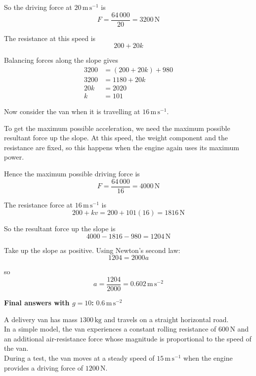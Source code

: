\documentclass[leqno]{article}
\begin{document}
\begin{enumerate}[
  label=\textbf{\arabic*.},
  leftmargin=*,
  topsep=0pt,
  partopsep=0pt,
  parsep=0pt
]
\begin{djsSolution}
So the driving force at $20\,\mathrm{m\,s^{-1}}$ is
\[
F = \frac{64\,000}{20} = 3200\,\mathrm{N}
\]

The resistance at this speed is
\[
200 + 20k
\]

Balancing forces along the slope gives
\begin{align*}
3200 &= (200+20k) + 980 \\
3200 &= 1180 + 20k \\
20k &= 2020 \\
k &= 101
\end{align*}

Now consider the van when it is travelling at $16\,\mathrm{m\,s^{-1}}$.

To get the maximum possible acceleration, we need the maximum possible resultant force up the slope. At this speed, the weight component and the resistance are fixed, so this happens when the engine again uses its maximum power.

Hence the maximum possible driving force is
\[
F = \frac{64\,000}{16} = 4000\,\mathrm{N}
\]

The resistance force at $16\,\mathrm{m\,s^{-1}}$ is
\[
200 + kv = 200 + 101(16) = 1816\,\mathrm{N}
\]

So the resultant force up the slope is
\[
4000 - 1816 - 980 = 1204\,\mathrm{N}
\]

Take up the slope as positive. Using Newton's second law:
\[
1204 = 2000a
\]

so
\[
a = \frac{1204}{2000} = 0.602\,\mathrm{m\,s^{-2}}
\]

\par\medskip\noindent\textbf{Final answers with \(g = 10\):} \(0.6\,\mathrm{m\,s^{-2}}\)
\end{djsSolution}


\newpage

\questionitem

A delivery van has mass $1300\,\mathrm{kg}$ and travels on a straight horizontal road. \\

In a simple model, the van experiences a constant rolling resistance of $600\,\mathrm{N}$ and an additional air-resistance force whose magnitude is proportional to the speed of the van. \\

During a test, the van moves at a steady speed of $15\,\mathrm{m\,s^{-1}}$ when the engine provides a driving force of $1200\,\mathrm{N}$. \\


\end{enumerate}
\end{document}
